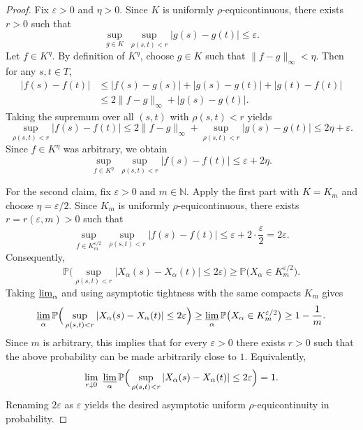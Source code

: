 \documentclass[12pt]{article}
\renewcommand{\(}{\left(}%
\renewcommand{\)}{\right)}%
\renewcommand{\[}{\left[}%
\renewcommand{\]}{\right]}%
\newtheorem{proof}{Proof.}}
\begin{document}
\begin{proof}
Fix $\varepsilon>0$ and $\eta>0$. Since $K$ is uniformly $\rho$-equicontinuous, there exists $r>0$ such that
\begin{equation*}
\sup_{g\in K}\ \sup_{\rho(s,t)<r}|g(s)-g(t)| \le \varepsilon.
\end{equation*}
Let $f\in K^\eta$. By definition of $K^\eta$, choose $g\in K$ such that $\|f-g\|_\infty<\eta$. Then for any $s,t\in T$,
\begin{equation*}
\begin{split}
	|f(s)-f(t)|
&\le |f(s)-g(s)| + |g(s)-g(t)| + |g(t)-f(t)|\\
&\le 2\|f-g\|_\infty + |g(s)-g(t)|.
\end{split}
\end{equation*}
Taking the supremum over all $(s,t)$ with $\rho(s,t)<r$ yields
\begin{equation*}
\sup_{\rho(s,t)<r}|f(s)-f(t)|
\le 2\|f-g\|_\infty + \sup_{\rho(s,t)<r}|g(s)-g(t)|
\le 2\eta + \varepsilon.
\end{equation*}
Since $f\in K^\eta$ was arbitrary, we obtain
\begin{equation*}
\sup_{f\in K^\eta}\ \sup_{\rho(s,t)<r}|f(s)-f(t)| \le \varepsilon + 2\eta.
\end{equation*}

For the second claim, fix $\varepsilon>0$ and $m\in\mathbb{N}$. Apply the first part with $K=K_m$ and choose $\eta=\varepsilon/2$. Since $K_m$ is uniformly $\rho$-equicontinuous, there exists $r=r(\varepsilon,m)>0$ such that
\begin{equation*}
\sup_{f\in K_m^{\varepsilon/2}}\ \sup_{\rho(s,t)<r}|f(s)-f(t)| \le \varepsilon + 2\cdot\frac{\varepsilon}{2}=2\varepsilon.
\end{equation*}
Consequently,
\begin{equation*}
\mathbb{P}\Big(\sup_{\rho(s,t)<r}|X_\alpha(s)-X_\alpha(t)|\le 2\varepsilon\Big)
\ge \mathbb{P}\big(X_\alpha \in K_m^{\varepsilon/2}\big).
\end{equation*}
Taking $\varliminf_\alpha$ and using asymptotic tightness with the same compacts $K_m$ gives
\begin{equation*}
\varliminf_\alpha \mathbb{P}\Big(\sup_{\rho(s,t)<r}|X_\alpha(s)-X_\alpha(t)|\le 2\varepsilon\Big)
\ge \varliminf_\alpha \mathbb{P}\big(X_\alpha \in K_m^{\varepsilon/2}\big)
\ge 1-\frac{1}{m}.
\end{equation*}
Since $m$ is arbitrary, this implies that for every $\varepsilon>0$ there exists $r>0$ such that the above probability can be made arbitrarily close to $1$. Equivalently,
\begin{equation*}
\lim_{r\downarrow 0}\ \varliminf_\alpha \mathbb{P}\Big(\sup_{\rho(s,t)<r}|X_\alpha(s)-X_\alpha(t)|\le 2\varepsilon\Big)=1.
\end{equation*}
Renaming $2\varepsilon$ as $\varepsilon$ yields the desired asymptotic uniform $\rho$-equicontinuity in probability.
\end{proof}
\end{document}
